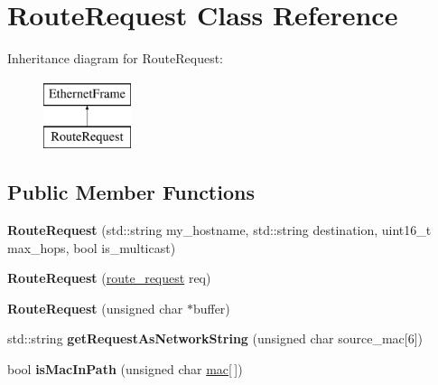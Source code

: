 \hypertarget{classRouteRequest}{\section{Route\-Request Class Reference}
\label{classRouteRequest}
}
Inheritance diagram for Route\-Request\-:\begin{figure}[H]
\begin{center}
\leavevmode
\includegraphics[height=2.000000cm]{classRouteRequest}
\end{center}
\end{figure}
\subsection*{Public Member Functions}
\begin{DoxyCompactItemize}
\item 
\hypertarget{classRouteRequest_a69e3830a1c98ff890d1b0363410ef324}{{\bfseries Route\-Request} (std\-::string my\-\_\-hostname, std\-::string destination, uint16\-\_\-t max\-\_\-hops, bool is\-\_\-multicast)}\label{classRouteRequest_a69e3830a1c98ff890d1b0363410ef324}

\item 
\hypertarget{classRouteRequest_a523ea5e1698dfa54e63ec833054b3bf5}{{\bfseries Route\-Request} (\hyperlink{structroute__request}{route\-\_\-request} req)}\label{classRouteRequest_a523ea5e1698dfa54e63ec833054b3bf5}

\item 
\hypertarget{classRouteRequest_a6841472de2ea7b9059dc95ddda875ec5}{{\bfseries Route\-Request} (unsigned char $\ast$buffer)}\label{classRouteRequest_a6841472de2ea7b9059dc95ddda875ec5}

\item 
\hypertarget{classRouteRequest_a524f45788b485bfaf71b4fd6547d8843}{std\-::string {\bfseries get\-Request\-As\-Network\-String} (unsigned char source\-\_\-mac\mbox{[}6\mbox{]})}\label{classRouteRequest_a524f45788b485bfaf71b4fd6547d8843}

\item 
\hypertarget{classRouteRequest_abf39fb926d81d1070db943578f704c2b}{bool {\bfseries is\-Mac\-In\-Path} (unsigned char \hyperlink{structmac}{mac}\mbox{[}$\,$\mbox{]})}\label{classRouteRequest_abf39fb926d81d1070db943578f704c2b}

\end{DoxyCompactItemize}
